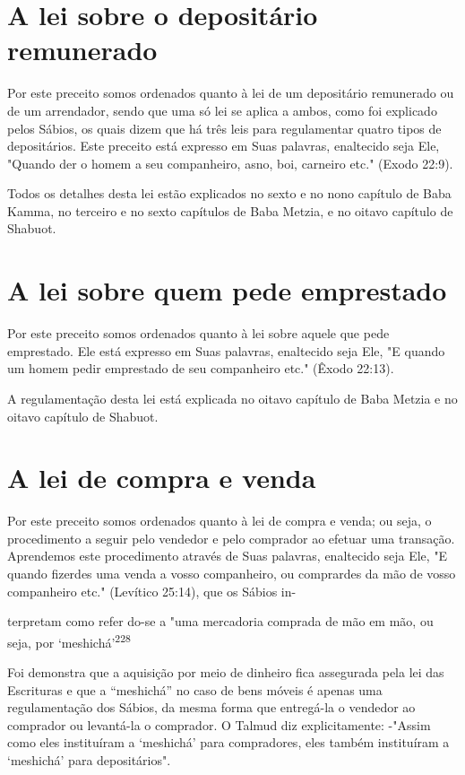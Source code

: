 \section{A lei sobre o depositário remunerado}

Por este preceito somos ordenados quanto à lei de um depositário
remunerado ou de um arrendador, sendo que uma só lei se aplica a ambos,
co­mo foi explicado pelos Sábios, os quais dizem que há três leis para
regulamen­tar quatro tipos de depositários. Este preceito está expresso
em Suas palavras, enaltecido seja Ele, "Quando der o homem a seu
companheiro, asno, boi, car­neiro etc." (Exodo 22:9).

Todos os detalhes desta lei estão explicados no sexto e no nono
ca­pítulo de Baba Kamma, no terceiro e no sexto capítulos de Baba
Metzia, e no oitavo capítulo de Shabuot.

\section{A lei sobre quem pede emprestado}

Por este preceito somos ordenados quanto à lei sobre aquele que pede
emprestado. Ele está expresso em Suas palavras, enaltecido seja Ele, "E
quando um homem pedir emprestado de seu companheiro etc." (Êxodo 22:13).

A regulamentação desta lei está explicada no oitavo capítulo de Ba­ba
Metzia e no oitavo capítulo de Shabuot.

\section{A lei de compra e venda}

Por este preceito somos ordenados quanto à lei de compra e venda; ou
seja, o procedimento a seguir pelo vendedor e pelo comprador ao efetuar
uma transação. Aprendemos este procedimento através de Suas palavras,
enal­tecido seja Ele, "E quando fizerdes uma venda a vosso companheiro,
ou com­prardes da mão de vosso companheiro etc." (Levítico 25:14), que
os Sábios in-



terpretam como refer do-se a "uma mercadoria comprada de mão em mão, ou
seja, por `meshichá'\textsuperscript{228}

Foi demonstra que a aquisição por meio de dinheiro fica assegu­rada pela
lei das Escrituras e que a ``meshichá'' no caso de bens móveis é ape­nas
uma regulamentação dos Sábios, da mesma forma que entregá-la o vende­dor
ao comprador ou levantá-la o comprador. O Talmud diz explicitamente:
-"Assim como eles instituíram a `meshichá' para compradores, eles também
ins­tituíram a `meshichá' para depositários".

